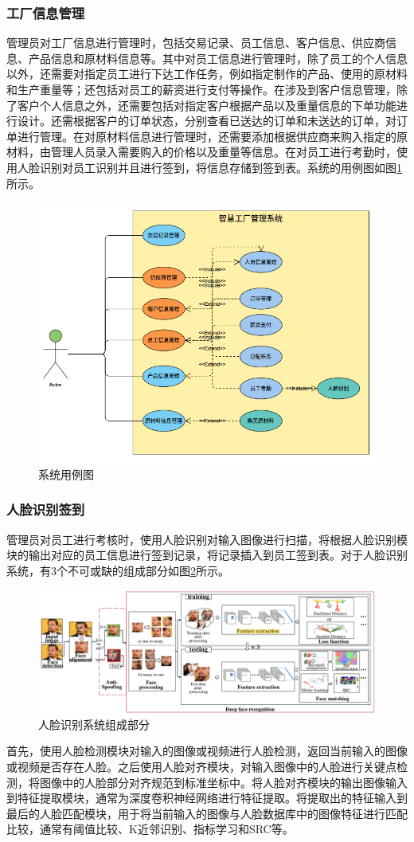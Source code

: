 \subsubsection{工厂信息管理}

管理员对工厂信息进行管理时，包括交易记录、员工信息、客户信息、供应商信息、产品信息和原材料信息等。其中对员工信息进行管理时，除了员工的个人信息以外，还需要对指定员工进行下达工作任务，例如指定制作的产品、使用的原材料和生产重量等；还包括对员工的薪资进行支付等操作。在涉及到客户信息管理，除了客户个人信息之外，还需要包括对指定客户根据产品以及重量信息的下单功能进行设计。还需根据客户的订单状态，分别查看已送达的订单和未送达的订单，对订单进行管理。在对原材料信息进行管理时，还需要添加根据供应商来购入指定的原材料，由管理人员录入需要购入的价格以及重量等信息。在对员工进行考勤时，使用人脸识别对员工识别并且进行签到，将信息存储到签到表。系统的用例图如图\ref{fig:usecase}所示。

\begin{figure}[H]
    \centering
    \includegraphics[width=.75\textwidth]{figures/3usecase.png}
    \caption{系统用例图}
    \label{fig:usecase}
\end{figure}

\subsubsection{人脸识别签到}

管理员对员工进行考核时，使用人脸识别对输入图像进行扫描，将根据人脸识别模块的输出对应的员工信息进行签到记录，将记录插入到员工签到表。对于人脸识别系统\cite{deepfrsurvey}，有3个不可或缺的组成部分如图\ref{fig:facerec}所示。

\begin{figure}[H]
    \centering
    \includegraphics[width=\textwidth]{figures/3facerec.png}
    \caption{人脸识别系统组成部分}
    \label{fig:facerec}
\end{figure}

首先，使用人脸检测模块对输入的图像或视频进行人脸检测，返回当前输入的图像或视频是否存在人脸。之后使用人脸对齐模块，对输入图像中的人脸进行关键点检测，将图像中的人脸部分对齐规范到标准坐标中。将人脸对齐模块的输出图像输入到特征提取模块，通常为深度卷积神经网络进行特征提取。将提取出的特征输入到最后的人脸匹配模块，用于将当前输入的图像与人脸数据库中的图像特征进行匹配比较，通常有阈值比较、K近邻识别、指标学习和SRC等。